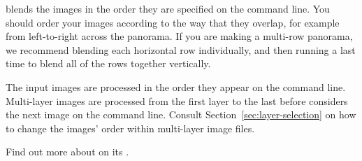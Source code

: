 \App{} blends the images in the order they are specified on the
command line.  You should order your images according to the way that
they overlap, for example from left-to-right across the panorama.  If
you are making a multi-row panorama, we recommend blending each
horizontal row individually, and then running \App{} a last time to
blend all of the rows together vertically.

The input images are processed in the order they appear on the command
line.  Multi\hyp{}layer images are processed from the first layer to
the last before \App{} considers the next image on the command line.
Consult Section~\ref{sec:layer-selection} on how to change the images'
order within multi\hyp{}layer image files.

Find out more about \App{} on its
.

